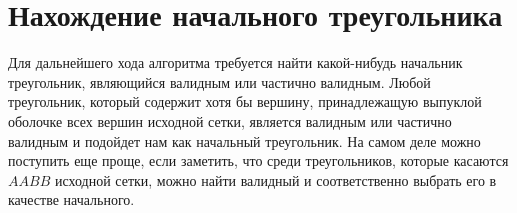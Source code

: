 \section{Нахождение начального треугольника}

Для дальнейшего хода алгоритма требуется найти какой-нибудь начальник треугольник, являющийся валидным или частично валидным. Любой треугольник, который содержит хотя бы вершину, принадлежащую выпуклой оболочке всех вершин исходной сетки, является валидным или частично валидным и подойдет нам как начальный треугольник. На самом деле можно поступить еще проще, если заметить, что среди треугольников, которые касаются $AABB$ исходной сетки, можно найти валидный и соответственно выбрать его в качестве начального.